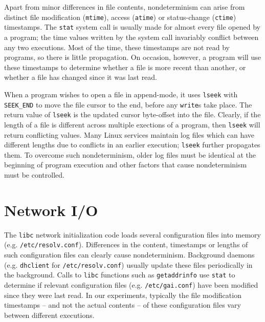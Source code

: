  \newline
Apart from minor differences in file contents,
nondeterminism can arise from distinct file 
modification (\texttt{mtime}), access (\texttt{atime}) or status-change (\texttt{ctime})
timestamps.
The \texttt{stat} system call is usually made for almost
every file opened by a program; the time values
written by the system call invariably
conflict between any two executions. Most of the time,
these timestamps are not read by programs,
so there is little propagation. On occasion, 
however, a program will use these timestamps
to determine whether a file is more recent than another,
or whether a file has changed since
it was last read. \newline

 \newline
When a program wishes to open
a file in append-mode, it uses \texttt{lseek}
with \texttt{SEEK\_END} to move
the file cursor to the end,
before any \texttt{write}s take place.
The return value of \texttt{lseek} is the
updated cursor byte-offset into the file.
Clearly, if the length of a file is different across
multiple exections of a program, then
\texttt{lseek} will return conflicting values.
Many Linux services maintain log files
which can have different lengths due
to conflicts in an earlier execution; \texttt{lseek}
further propagates them. To overcome
such nondeterminism, older log files
must be identical at the beginning 
of program execution and other
factors that cause nondeterminism
must be controlled. 

\newpage

\section{Network I/O} \label{ch3:netio}
 \newline
The \texttt{libc} network initialization
code loads several configuration files
into memory (e.g. \texttt{/etc/resolv.conf}). 
Differences in the content, timestamps or lengths
of such configuration files can clearly cause nondeterminism.
Background daemons (e.g. \texttt{dhclient} for \texttt{/etc/resolv.conf}) 
usually update these files periodically in the background.
Calls to \texttt{libc} functions such as \texttt{getaddrinfo} use \texttt{stat} 
to determine if relevant configuration files (e.g. \texttt{/etc/gai.conf})
have been modified since they were last read. 
In our experiments, typically the file modification timestamps 
-- and not the actual contents -- of these configuration files 
vary between different executions. \newline

